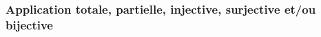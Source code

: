 \documentclass[12pt,a4paper]{article}
\theoremstyle{definition}
\begin{document}
\subsubsection{Application totale, partielle, injective, surjective et/ou bijective}



\vspace{-.75em}
\begin{multicols}{2}
    
    
    
    
    
    
    
\end{multicols}
\end{document}
